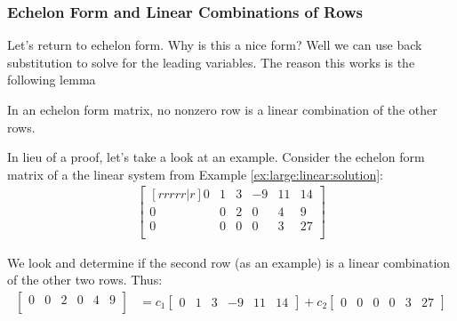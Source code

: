 \subsubsection{Echelon Form and Linear Combinations of Rows}

Let's return to echelon form.  Why is this a nice form?  Well we can use back substitution to solve for the leading variables.  The reason this works is the following lemma

\begin{lemma}In an echelon form matrix, no nonzero row is a linear combination of the other rows.   \label{lem:ech:ind}
\end{lemma}


In lieu of a proof, let's take a look at an example.  Consider  the echelon form matrix of a the linear system from Example \ref{ex:large:linear:solution}:
%
\begin{align*}
\begin{bmatrix}[rrrrr|r]
0 & 1 & 3 & -9 & 11 & 14 \\
0 & 0 & 2 & 0 & 4 & 9 \\
0 & 0 & 0 & 0 & 3 & 27 \\
\end{bmatrix}
\end{align*}

We look and determine if the second row (as an example) is a linear combination of the other two rows.  Thus:
%
\begin{align*}
\begin{bmatrix}
0 & 0 & 2 & 0 & 4 & 9 \\
\end{bmatrix} & = c_1 \begin{bmatrix}
0 & 1 & 3 & -9 & 11 & 14
\end{bmatrix} + c_2 \begin{bmatrix}
0 & 0 & 0 & 0 & 3 & 27
\end{bmatrix}
\end{align*}

